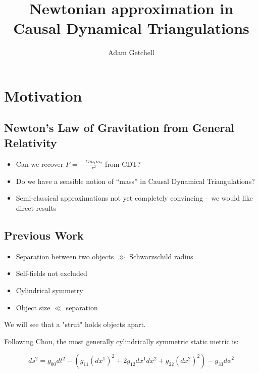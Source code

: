 \documentclass{article}
\title{Newtonian approximation in Causal Dynamical Triangulations}
\author{Adam Getchell}
\date{}
\begin{document}
\maketitle
\tableofcontents

\section{Motivation}
\subsection[Basic Problem]{Newton's Law of Gravitation from General Relativity}

\begin{itemize}
\item Can we recover $F=-\frac{Gm_{1}m_{2}}{r^{2}}$ from CDT?

\item Do we have a sensible notion of \textquotedblleft{}mass\textquotedblright{}
in Causal Dynamical Triangulations?

\item Semi-classical approximations not yet completely convincing \cite{trzesniewski2011analysis}
-- we would like direct results
\end{itemize}

\subsection{Previous Work}

\begin{itemize}
\item Separation between two objects $\gg$ Schwarzschild radius

\item Self-fields not excluded

\item Cylindrical symmetry

\item Object size $\ll$ separation

\end{itemize}

We will see that a "strut" holds objects apart.

Following Chou\cite{chou1931thegravitational}, the most generally cylindrically
symmetric static metric is:

\begin{equation}
ds^{2}=g_{00}dt^{2}-\left(g_{11}\left(dx^{1}\right)^{2}+2g_{12}dx^{1}dx^{2}+g_{22}\left(dx^{2}\right)^{2}\right)-g_{33}d\phi^{2}\label{eq:positive-definite-quadratic-differential}
\end{equation}
\end{document}
